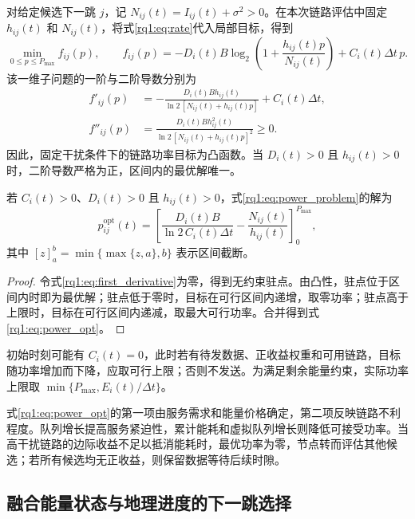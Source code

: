 对给定候选下一跳 $j$，记 $N_{ij}(t)=I_{ij}(t)+\sigma^2>0$。在本次链路评估中固定 $h_{ij}(t)$ 和 $N_{ij}(t)$，将式\eqref{rq1:eq:rate}代入局部目标，得到
\begin{equation}
 \min_{0\le p\le P_{\max}} f_{ij}(p),\qquad
 f_{ij}(p)=-D_i(t)B\log_2\!\left(1+\frac{h_{ij}(t)p}{N_{ij}(t)}\right)
                         +C_i(t)\Delta t\,p.
 \label{rq1:eq:power_problem}
\end{equation}
该一维子问题的一阶与二阶导数分别为
\begin{align}
 f'_{ij}(p)&=-\frac{D_i(t)Bh_{ij}(t)}{\ln2\,[N_{ij}(t)+h_{ij}(t)p]}
                       +C_i(t)\Delta t,
 \label{rq1:eq:first_derivative}\\
 f''_{ij}(p)&=\frac{D_i(t)B h_{ij}^2(t)}{\ln2\,[N_{ij}(t)+h_{ij}(t)p]^2}\ge0.
 \label{rq1:eq:second_derivative}
\end{align}
因此，固定干扰条件下的链路功率目标为凸函数。当 $D_i(t)>0$ 且 $h_{ij}(t)>0$ 时，二阶导数严格为正，区间内的最优解唯一。

\begin{proposition}[固定干扰下的链路功率最优解]
\label{rq1:prop:power}
若 $C_i(t)>0$、$D_i(t)>0$ 且 $h_{ij}(t)>0$，式\eqref{rq1:eq:power_problem}的解为
\begin{equation}
 p_{ij}^{\mathrm{opt}}(t)=
 \left[\frac{D_i(t)B}{\ln2\,C_i(t)\Delta t}
            -\frac{N_{ij}(t)}{h_{ij}(t)}\right]_{0}^{P_{\max}},
 \label{rq1:eq:power_opt}
\end{equation}
其中 $[z]_{a}^{b}=\min\{\max\{z,a\},b\}$ 表示区间截断。
\end{proposition}
\begin{proof}
令式\eqref{rq1:eq:first_derivative}为零，得到无约束驻点。由凸性，驻点位于区间内时即为最优解；驻点低于零时，目标在可行区间内递增，取零功率；驻点高于上限时，目标在可行区间内递减，取最大可行功率。合并得到式\eqref{rq1:eq:power_opt}。
\end{proof}

初始时刻可能有 $C_i(t)=0$，此时若有待发数据、正收益权重和可用链路，目标随功率增加而下降，应取可行上限；否则不发送。为满足剩余能量约束，实际功率上限取 $\min\{P_{\max},E_i(t)/\Delta t\}$。

式\eqref{rq1:eq:power_opt}的第一项由服务需求和能量价格确定，第二项反映链路不利程度。队列增长提高服务紧迫性，累计能耗和虚拟队列增长则降低可接受功率。当高干扰链路的边际收益不足以抵消能耗时，最优功率为零，节点转而评估其他候选；若所有候选均无正收益，则保留数据等待后续时隙。

\subsection{融合能量状态与地理进度的下一跳选择}

